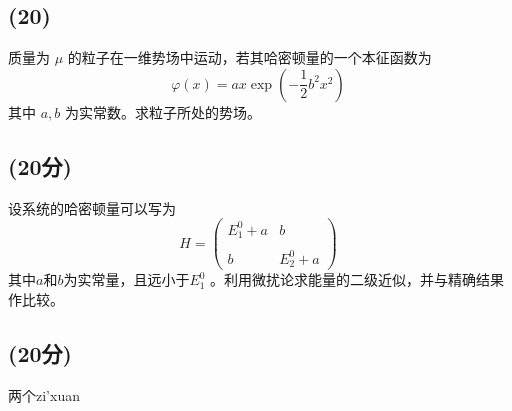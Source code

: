 \subsection{(20)}
质量为 $\mu$ 的粒子在一维势场中运动，若其哈密顿量的一个本征函数为
\[
\varphi(x) = a x \exp \left( -\frac{1}{2}b^2 x^2 \right)~
\]
其中 $a, b$ 为实常数。求粒子所处的势场。
\subsection{(20分)}
设系统的哈密顿量可以写为
$$H = \begin{pmatrix} E^0_1 + a & b \\\\ b & E^0_2 + a \end{pmatrix}~$$
其中$a$和$b$为实常量，且远小于$E^0_1$ 。利用微扰论求能量的二级近似，并与精确结果作比较。
\subsection{(20分)}
两个zi'xuan
